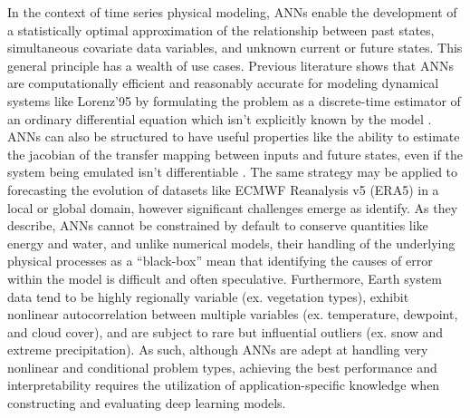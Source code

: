 In the context of time series physical modeling, ANNs enable the development of a statistically optimal approximation of the relationship between past states, simultaneous covariate data variables, and unknown current or future states. This general principle has a wealth of use cases. Previous literature shows that ANNs are computationally efficient and reasonably accurate for modeling dynamical systems like Lorenz'95 by formulating the problem as a discrete-time estimator of an ordinary differential equation which isn't explicitly known by the model \parencite{fablet_bilinear_2018}. ANNs can also be structured to have useful properties like the ability to estimate the jacobian of the transfer mapping between inputs and future states, even if the system being emulated isn't differentiable \parencite{nonnenmacher_deep_2021}. The same strategy may be applied to forecasting the evolution of datasets like ECMWF Reanalysis v5 (ERA5) in a local or global domain, however significant challenges emerge as \parencite{dueben_challenges_2018} identify. As they describe, ANNs cannot be constrained by default to conserve quantities like energy and water, and unlike numerical models, their handling of the underlying physical processes as a ``black-box'' mean that identifying the causes of error within the model is difficult and often speculative. Furthermore, Earth system data tend to be highly regionally variable (ex. vegetation types), exhibit nonlinear autocorrelation between multiple variables (ex. temperature, dewpoint, and cloud cover), and are subject to rare but influential outliers (ex. snow and extreme precipitation). As such, although ANNs are adept at handling very nonlinear and conditional problem types, achieving the best performance and interpretability requires the utilization of application-specific knowledge when constructing and evaluating deep learning models.

